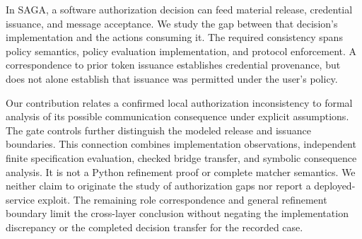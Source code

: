 In SAGA, a software authorization decision can feed material release,
credential issuance, and message acceptance. We study the gap between that
decision's implementation and the actions consuming it. The required
consistency spans policy semantics, policy evaluation implementation, and
protocol enforcement. A correspondence to prior token issuance establishes
credential provenance, but does not alone establish that issuance was
permitted under the user's policy.

Our contribution relates a confirmed local authorization inconsistency to
formal analysis of its possible communication consequence under explicit
assumptions. The gate controls further distinguish the modeled release and
issuance boundaries. This connection combines implementation observations,
independent finite specification evaluation, checked bridge transfer, and
symbolic consequence analysis. It is not a Python refinement proof or
complete matcher semantics. We neither claim to originate the study of
authorization gaps nor report a deployed-service exploit. The remaining
role correspondence and general refinement boundary limit the cross-layer
conclusion without negating the implementation discrepancy or the completed
decision transfer for the recorded case.

